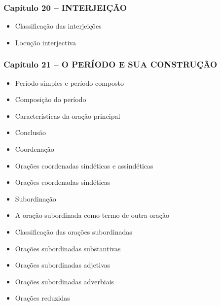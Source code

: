 \documentclass[a4paper,12pt]{article}[abntex2]
\begin{document}
\subsubsection*{Capítulo 20 – INTERJEIÇÃO}
\begin{itemize}
    \item Classificação das interjeições
    \item Locução interjectiva
\end{itemize}

\subsubsection*{Capítulo 21 – O PERÍODO E SUA CONSTRUÇÃO}
\begin{itemize}
    \item Período simples e período composto
    \item Composição do período
    \item Características da oração principal
    \item Conclusão
    \item Coordenação
    \item Orações coordenadas sindéticas e assindéticas
    \item Orações coordenadas sindéticas
    \item Subordinação
    \item A oração subordinada como termo de outra oração
    \item Classificação das orações subordinadas
    \item Orações subordinadas substantivas
    \item Orações subordinadas adjetivas
    \item Orações subordinadas adverbiais
    \item Orações reduzidas
\end{itemize}
\end{document}
